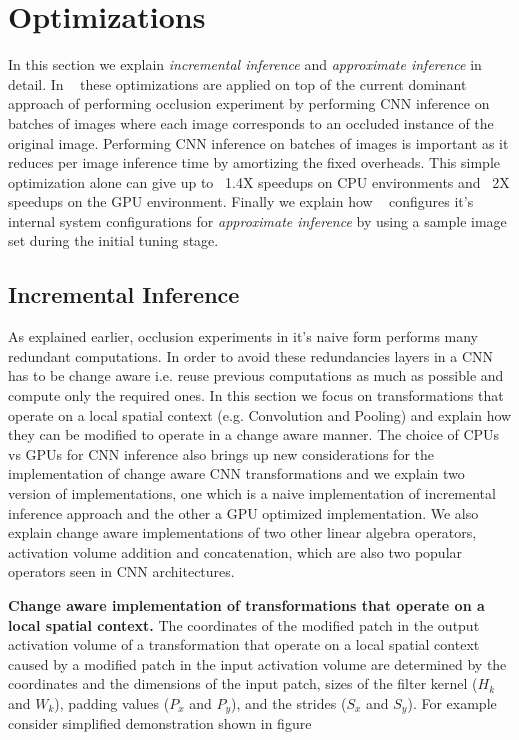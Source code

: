 \section{Optimizations}

In this section we explain \textit{incremental inference} and \textit{approximate inference} in detail.
In \system~ these optimizations are applied on top of the current dominant approach of performing occlusion experiment by performing CNN inference on batches of images where each image corresponds to an occluded instance of the original image.
Performing CNN inference on batches of images is important as it reduces per image inference time by amortizing the fixed overheads.
This simple optimization alone can give up to ~1.4X speedups on CPU environments and ~2X speedups on the GPU environment.
Finally we explain how \system~ configures it's internal system configurations for \textit{approximate inference} by using a sample image set during the initial tuning stage. 

\subsection{Incremental Inference}\label{sec:inc_computation}

As explained earlier, occlusion experiments in it's naive form performs many redundant computations.
In order to avoid these redundancies layers in a CNN has to be change aware i.e. reuse previous computations as much as possible and compute only the required ones.
In this section we focus on transformations that operate on a local spatial context (e.g. Convolution and Pooling) and explain how they can be modified to operate in a change aware manner.
The choice of CPUs vs GPUs for CNN inference also brings up new considerations for the implementation of change aware CNN transformations and we explain two version of implementations, one which is a naive implementation of incremental inference approach and the other a GPU optimized implementation.
We also explain change aware implementations of two other linear algebra operators, activation volume addition and concatenation, which are also two popular operators seen in CNN architectures.

\vspace{2mm}
\noindent \textbf{Change aware implementation of transformations that operate on a local spatial context.} 
The coordinates of the modified patch in the output activation volume of a transformation that operate on a local spatial context caused by a modified patch in the input activation volume are determined by the coordinates and the dimensions of the input patch, sizes of the filter kernel ($H_k$ and $W_k$), padding values ($P_x$ and $P_y$), and the strides ($S_x$ and $S_y$).
For example consider simplified demonstration shown in figure 



